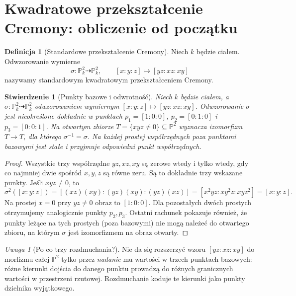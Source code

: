\documentclass[11pt,a4paper,openany]{report}
\numberwithin{equation}{section}
\theoremstyle{plain}
\newtheorem{stwierdzenie}[twierdzenie]{Stwierdzenie}
\theoremstyle{definition}
\newtheorem{definicja}[twierdzenie]{Definicja}
\theoremstyle{remark}
\newtheorem{uwaga}[twierdzenie]{Uwaga}
\newcommand{\PP}{\mathbb P}
\begin{document}
\section{Kwadratowe przekształcenie Cremony: obliczenie od początku}
\label{sec:ga8-cremona}

\begin{definicja}[Standardowe przekształcenie Cremony]
\label{def:ga8-cremona}
Niech $k$ będzie ciałem. Odwzorowanie wymierne
\[
\sigma:\PP^2_k\dashrightarrow\PP^2_k,\qquad
[x:y:z]\longmapsto[yz:xz:xy]
\]
nazywamy standardowym kwadratowym przekształceniem Cremony.
\end{definicja}

\begin{stwierdzenie}[Punkty bazowe i odwrotność]
\label{st:ga8-cremona-basic}
Niech $k$ będzie ciałem, a
$\sigma:\PP^2_k\dashrightarrow\PP^2_k$ odwzorowaniem wymiernym
$[x:y:z]\mapsto[yz:xz:xy]$.
Odwzorowanie $\sigma$ jest nieokreślone dokładnie w punktach
$p_1=[1:0:0]$, $p_2=[0:1:0]$ i $p_3=[0:0:1]$.
Na otwartym zbiorze $T=\{xyz\ne0\}\subseteq\PP^2$
wyznacza izomorfizm $T\to T$, dla którego
$\sigma^{-1}=\sigma$. Na każdej prostej współrzędnych
poza punktami bazowymi jest stałe i przyjmuje
odpowiedni punkt współrzędnych.
\end{stwierdzenie}
\begin{proof}
Wszystkie trzy współrzędne $yz,xz,xy$ są zerowe
wtedy i tylko wtedy, gdy co najmniej dwie spośród
$x,y,z$ są równe zeru. Są to dokładnie trzy wskazane
punkty. Jeśli $xyz\ne0$, to
\[
\sigma^2([x:y:z])
=[(xz)(xy):(yz)(xy):(yz)(xz)]
=[x^2yz:xy^2z:xyz^2]=[x:y:z].
\]
Na prostej $x=0$ przy $yz\ne0$ obraz to $[1:0:0]$.
Dla pozostałych dwóch prostych otrzymujemy analogicznie
punkty $p_2,p_3$. Ostatni rachunek pokazuje również,
że punkty leżące na tych prostych (poza bazowymi)
nie mogą należeć do otwartego zbioru, na którym
$\sigma$ jest izomorfizmem na obraz otwarty.
\end{proof}

\begin{uwaga}[Po co trzy rozdmuchania?]
Nie da się rozszerzyć wzoru $[yz:xz:xy]$ do morfizmu
całej $\PP^2$ tylko przez \emph{nadanie} mu wartości
w trzech punktach bazowych: różne kierunki dojścia
do danego punktu prowadzą do różnych granicznych
wartości w przestrzeni rzutowej. Rozdmuchanie koduje
te kierunki jako punkty dzielnika wyjątkowego.
\end{uwaga}
\end{document}
